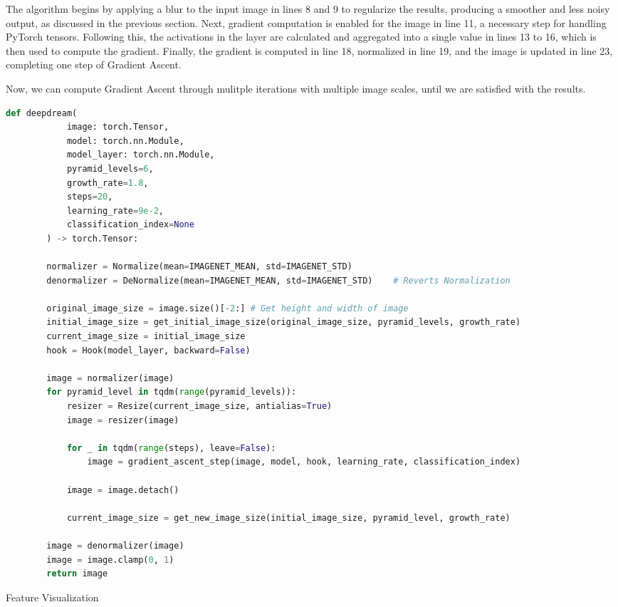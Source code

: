 \noindent The algorithm begins by applying a blur to the input image in lines 8 and 9 to regularize the results, producing a smoother and less noisy output, as discussed in the previous section.
Next, gradient computation is enabled for the image in line 11, a necessary step for handling PyTorch tensors.
Following this, the activations in the layer are calculated and aggregated into a single value in lines 13 to 16, which is then used to compute the gradient.
Finally, the gradient is computed in line 18, normalized in line 19, and the image is updated in line 23, completing one step of Gradient Ascent.

Now, we can compute Gradient Ascent through mulitple iterations with multiple image scales, until we are satisfied with the results. 

\begin{program}
    \centering
    \label{code:feat_visualization}

    \begin{lstlisting}[language=Python, style=wider]
        def deepdream(
            image: torch.Tensor,
            model: torch.nn.Module,
            model_layer: torch.nn.Module,
            pyramid_levels=6,
            growth_rate=1.8,
            steps=20,
            learning_rate=9e-2,
            classification_index=None
        ) -> torch.Tensor:
        
        normalizer = Normalize(mean=IMAGENET_MEAN, std=IMAGENET_STD)
        denormalizer = DeNormalize(mean=IMAGENET_MEAN, std=IMAGENET_STD)    # Reverts Normalization

        original_image_size = image.size()[-2:] # Get height and width of image
        initial_image_size = get_initial_image_size(original_image_size, pyramid_levels, growth_rate)
        current_image_size = initial_image_size
        hook = Hook(model_layer, backward=False)
        
        image = normalizer(image)
        for pyramid_level in tqdm(range(pyramid_levels)):
            resizer = Resize(current_image_size, antialias=True)
            image = resizer(image)

            for _ in tqdm(range(steps), leave=False):
                image = gradient_ascent_step(image, model, hook, learning_rate, classification_index)
            
            image = image.detach()

            current_image_size = get_new_image_size(initial_image_size, pyramid_level, growth_rate)
        
        image = denormalizer(image)
        image = image.clamp(0, 1)
        return image
    \end{lstlisting}

    \caption{Feature Visualization}
\end{program}

